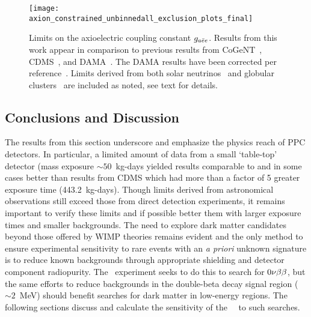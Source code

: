 		\begin{figure}
			\centering
			\texttt{[image: axion\_constrained\_unbinnedall\_exclusion\_plots\_final]}
			\caption[Limits on the axioelectric coupling constant $\gaa$]{Limits on the axioelectric 
			coupling constant $\gaa$.  Results from this work appear in comparison to previous 
			results from CoGeNT~\cite{Aalseth:2008aa}, CDMS~\cite{Ahmed2009}, and 
			DAMA~\cite{Bernabei:2005ca}.  The DAMA results have been corrected per 
			reference~\cite{Collar:2009sp}.  Limits derived from both solar neutrinos~\cite{Gondolo09} and globular clusters~\cite{Raffelt95} are included as noted, see text for details.}
			\label{fig:HeavyAxionLimits}
		\end{figure}
		
	\subsection{Conclusions and Discussion}
	\label{sec:DiscOnHeavyAxionLimits}	

	
	The results from this section underscore and emphasize the physics reach of PPC detectors.  In particular, a limited amount of data from a small `table-top' detector (mass exposure $\sim50$~kg-days yielded results comparable to and in some cases better than results from CDMS which had more than a factor of 5 greater exposure time (443.2~kg-days).  Though limits derived from astronomical observations still exceed those from direct detection experiments, it remains important to verify these limits and if possible better them with larger exposure times and smaller backgrounds.  The need to explore dark matter candidates beyond those offered by WIMP theories remains evident and the only method to ensure experimental sensitivity to rare events with an \emph{a priori} unknown signature is to reduce known backgrounds through appropriate shielding and detector component radiopurity.  The \MJ~experiment seeks to do this to search for $0 \nu \beta \beta$, but the same efforts to reduce backgrounds in the double-beta decay signal region ($\sim2$~MeV) should benefit searches for dark matter in low-energy regions.  The following sections discuss and calculate the sensitivity of the \MJ~\minmod~to such searches.
							

